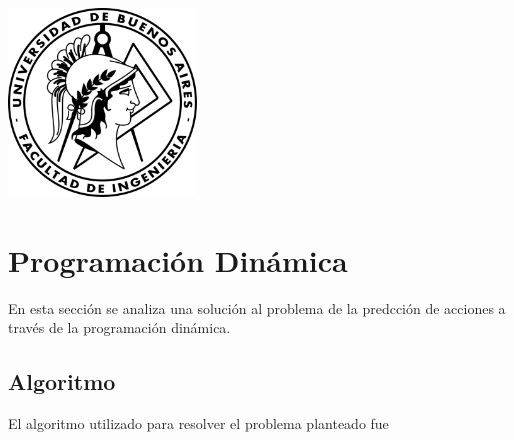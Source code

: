 \documentclass[a4paper, 10pt]{article}
\begin{document}
    \newpage

    \begin{center}
        \includegraphics[width=5cm, height=5cm]{images/logo}
    \end{center}


    \maketitle
    \newpage
    \tableofcontents
    \newpage

    \section{Programación Dinámica}
        En esta sección se analiza una solución al problema de la predcción de acciones a través
        de la programación dinámica.
        \subsection{Algoritmo}
            El algoritmo utilizado para resolver el problema planteado fue %
\end{document}
